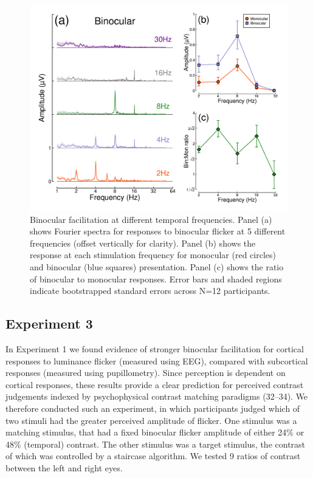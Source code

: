 \documentclass[
]{article}
\begin{document}
\begin{figure}

{\centering \includegraphics{Figures/TFdata} 

}

\caption{Binocular facilitation at different temporal frequencies. Panel (a) shows Fourier spectra for responses to binocular flicker at 5 different frequencies (offset vertically for clarity). Panel (b) shows the response at each stimulation frequency for monocular (red circles) and binocular (blue squares) presentation. Panel (c) shows the ratio of binocular to monocular responses. Error bars and shaded regions indicate bootstrapped standard errors across N=12 participants.}\label{fig:TFdata}
\end{figure}

\hypertarget{experiment-3}{%
\subsection{Experiment 3}\label{experiment-3}}

In Experiment 1 we found evidence of stronger binocular facilitation for cortical responses to luminance flicker (measured using EEG), compared with subcortical responses (measured using pupillometry). Since perception is dependent on cortical responses, these results provide a clear prediction for perceived contrast judgements indexed by psychophysical contrast matching paradigms (32--34). We therefore conducted such an experiment, in which participants judged which of two stimuli had the greater perceived amplitude of flicker. One stimulus was a matching stimulus, that had a fixed binocular flicker amplitude of either 24\% or 48\% (temporal) contrast. The other stimulus was a target stimulus, the contrast of which was controlled by a staircase algorithm. We tested 9 ratios of contrast between the left and right eyes.
\end{document}
